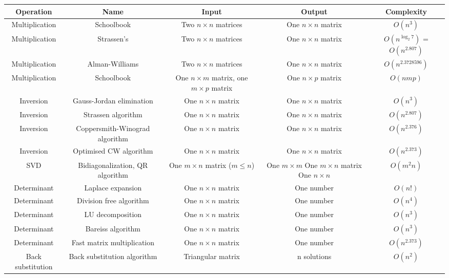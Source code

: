 \documentclass{article}
\begin{document}
\begin{table}[ht]
	\centering
	\scriptsize
	\begin{tabular}{c cccc}
		Operation & Name & Input & Output & Complexity \\
		\hline
		Multiplication & Schoolbook & Two $n \times n$ matrices & One $n\times n$ matrix & $O(n^3)$ \\
		Multiplication &Strassen's & Two $n \times n$  matrices & One $n\times n$ matrix &$O(n^{\log_2{7}})$ = $O(n^{2.807})$\\
	    Multiplication &Alman-Williams & Two $n \times n$  matrices & One $n\times n$ matrix& $O(n^{2.3728596})$ \\
		Multiplication &Schoolbook & One $n\times m$ matrix, one $m\times p$ matrix & One $n\times p$ matrix& $O(nmp)$  \\
		Inversion &Gauss-Jordan elimination & One $n\times n$ matrix & One $n\times n$ matrix& $O(n^3)$  \\
		Inversion &Strassen algorithm & One $n\times n$ matrix & One $n\times n$ matrix& $O(n^{2.807})$  \\
		Inversion &Coppersmith-Winograd algorithm & One $n\times n$ matrix & One $n\times n$ matrix& $O(n^{2.376})$ \\
		Inversion &Optimised CW algorithm & One $n\times n$ matrix & One $n\times n$ matrix& $O(n^{2.373})$  \\
		SVD &Bidiagonalization, QR algorithm & One $m\times n$ matrix ($m\leq n$)& \makecell {One $m\times m$ \\ One $m \times n$ matrix \\ One $n \times n$} & $O(m^2n)$  \\
		Determinant &Laplace expansion & One $n\times n$ matrix & One number & $O(n!)$ \\
		Determinant & Division free algorithm & One $n\times n$ matrix & One number & $O(n^4)$ \\
		Determinant & LU decomposition & One $n\times n$ matrix & One number & $O(n^3)$ \\
		Determinant & Bareiss algorithm & One $n\times n$ matrix & One number & $O(n^3)$ \\
		Determinant & Fast matrix multiplication & One $n\times n$ matrix & One number & $O(n^{2.373})$ \\
		Back substitution & Back substitution algorithm & Triangular matrix & n solutions & $O(n^2)$ \\
		\hline
	\end{tabular}
\end{table}
\end{document}
